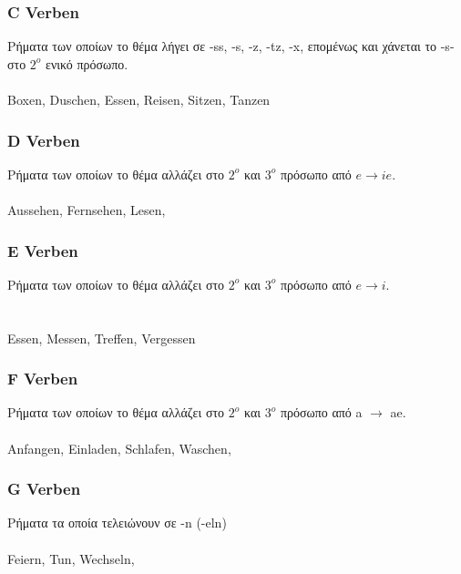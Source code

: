 \begin{appendix}
 \subsubsection{C Verben}
 Ρήματα των οποίων το θέμα λήγει σε -ss, -s, -z, -tz, -x, επομένως και χάνεται το -s- στο $2^o$ ενικό πρόσωπο. \\
  \\ \newline
 \gls{Boxen}, \gls{Duschen}, \gls{Essen}, \gls{Reisen}, \gls{Sitzen}, \gls{Tanzen} 
 
 \subsubsection{D Verben}
 Ρήματα των οποίων το θέμα αλλάζει στο $2^o$ και $3^ο$ πρόσωπο από $e \rightarrow ie$. \\
  \\
 
 \gls{Aussehen}, \gls{Fernsehen}, \gls{Lesen}, 
 
 \subsubsection{E Verben}
 Ρήματα των οποίων το θέμα αλλάζει στο $2^o$ και $3^ο$ πρόσωπο από $e \rightarrow i$. \\
  \\
  \\
 
 \gls{Essen}, \gls{Messen}, \gls{Treffen}, \gls{Vergessen}
 
 \subsubsection{F Verben}
 Ρήματα των οποίων το θέμα αλλάζει στο $2^o$ και $3^ο$ πρόσωπο από a $\rightarrow$ ae. \\
  \\
 
 \gls{Anfangen}, \gls{Einladen}, \gls{Schlafen}, \gls{Waschen}, 
 
 \subsubsection{G Verben}
 Ρήματα τα οποία τελειώνουν σε -n (-eln) \\
  \\
 \gls{Feiern}, \gls{Tun}, \gls{Wechseln}, 
 

\end{appendix}
